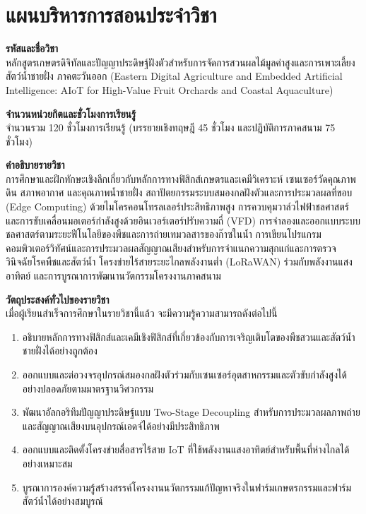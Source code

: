 \chapter*{แผนบริหารการสอนประจำวิชา}

\noindent\textbf{รหัสและชื่อวิชา}\\
หลักสูตรเกษตรดิจิทัลและปัญญาประดิษฐ์ฝังตัวสำหรับการจัดการสวนผลไม้มูลค่าสูงและการเพาะเลี้ยงสัตว์น้ำชายฝั่ง ภาคตะวันออก (Eastern Digital Agriculture and Embedded Artificial Intelligence: AIoT for High-Value Fruit Orchards and Coastal Aquaculture)

\vspace{0.3cm}
\noindent\textbf{จำนวนหน่วยกิตและชั่วโมงการเรียนรู้}\\
จำนวนรวม 120 ชั่วโมงการเรียนรู้ (บรรยายเชิงทฤษฎี 45 ชั่วโมง และปฏิบัติการภาคสนาม 75 ชั่วโมง)

\vspace{0.3cm}
\noindent\textbf{คำอธิบายรายวิชา}\\
การศึกษาและฝึกทักษะเชิงลึกเกี่ยวกับหลักการทางฟิสิกส์เกษตรและเคมีวิเคราะห์ เซนเซอร์วัดคุณภาพดิน สภาพอากาศ และคุณภาพน้ำชายฝั่ง สถาปัตยกรรมระบบสมองกลฝังตัวและการประมวลผลที่ขอบ (Edge Computing) ด้วยไมโครคอนโทรลเลอร์ประสิทธิภาพสูง การควบคุมวาล์วไฟฟ้าชลศาสตร์และการขับเคลื่อนมอเตอร์กำลังสูงด้วยอินเวอร์เตอร์ปรับความถี่ (VFD) การจำลองและออกแบบระบบชลศาสตร์ตามระยะฟีโนโลยีของพืชและการถ่ายเทมวลสารของก๊าซในน้ำ การเขียนโปรแกรมคอมพิวเตอร์วิทัศน์และการประมวลผลสัญญาณเสียงสำหรับการจำแนกความสุกแก่และการตรวจวินิจฉัยโรคพืชและสัตว์น้ำ โครงข่ายไร้สายระยะไกลพลังงานต่ำ (LoRaWAN) ร่วมกับพลังงานแสงอาทิตย์ และการบูรณาการพัฒนานวัตกรรมโครงงานภาคสนาม

\vspace{0.3cm}
\noindent\textbf{วัตถุประสงค์ทั่วไปของรายวิชา}\\
เมื่อผู้เรียนสำเร็จการศึกษาในรายวิชานี้แล้ว จะมีความรู้ความสามารถดังต่อไปนี้
\begin{enumerate}
    \item อธิบายหลักการทางฟิสิกส์และเคมีเชิงฟิสิกส์ที่เกี่ยวข้องกับการเจริญเติบโตของพืชสวนและสัตว์น้ำชายฝั่งได้อย่างถูกต้อง
    \item ออกแบบและต่อวงจรอุปกรณ์สมองกลฝังตัวร่วมกับเซนเซอร์อุตสาหกรรมและตัวขับกำลังสูงได้อย่างปลอดภัยตามมาตรฐานวิศวกรรม
    \item พัฒนาอัลกอริทึมปัญญาประดิษฐ์แบบ Two-Stage Decoupling สำหรับการประมวลผลภาพถ่ายและสัญญาณเสียงบนอุปกรณ์เอดจ์ได้อย่างมีประสิทธิภาพ
    \item ออกแบบและติดตั้งโครงข่ายสื่อสารไร้สาย IoT ที่ใช้พลังงานแสงอาทิตย์สำหรับพื้นที่ห่างไกลได้อย่างเหมาะสม
    \item บูรณาการองค์ความรู้สร้างสรรค์โครงงานนวัตกรรมแก้ปัญหาจริงในฟาร์มเกษตรกรรมและฟาร์มสัตว์น้ำได้อย่างสมบูรณ์
\end{enumerate}


